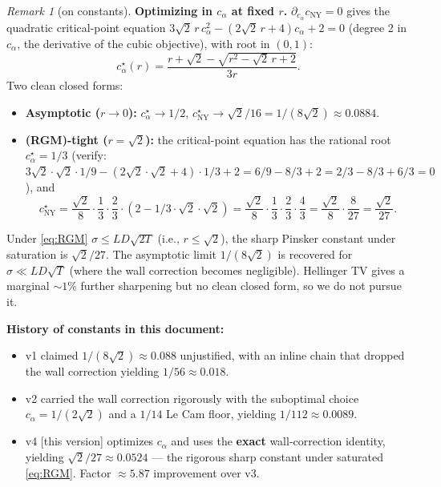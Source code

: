 \documentclass[11pt,a4paper]{article}
\theoremstyle{plain}
\theoremstyle{definition}
\theoremstyle{remark}
\newtheorem{remark}[theorem]{Remark}
\begin{document}
\begin{remark}[on constants]
\textbf{Optimizing in $c_\alpha$ at fixed $r$.} $\partial_{c_\alpha} c_\mathrm{NY} = 0$ gives the quadratic critical-point equation $3\sqrt 2\, r\, c_\alpha^2 - (2\sqrt 2\, r + 4) c_\alpha + 2 = 0$ (degree 2 in $c_\alpha$, the derivative of the cubic objective), with root in $(0, 1)$:
\[
c_\alpha^\star(r) = \frac{r + \sqrt 2 - \sqrt{r^2 - \sqrt 2\, r + 2}}{3 r}.
\]
Two clean closed forms:
\begin{itemize}
\item \textbf{Asymptotic ($r \to 0$):} $c_\alpha^\star \to 1/2$, $c_\mathrm{NY}^\star \to \sqrt 2/16 = 1/(8\sqrt 2) \approx 0.0884$.
\item \textbf{(RGM)-tight ($r = \sqrt 2$):} the critical-point equation has the rational root $c_\alpha^\star = 1/3$ (verify: $3\sqrt 2 \cdot \sqrt 2 \cdot 1/9 - (2\sqrt 2 \cdot \sqrt 2 + 4) \cdot 1/3 + 2 = 6/9 - 8/3 + 2 = 2/3 - 8/3 + 6/3 = 0$ \checkmark), and
\[
c_\mathrm{NY}^\star = \frac{\sqrt 2}{8}\cdot \frac{1}{3}\cdot \frac{2}{3}\cdot (2 - 1/3 \cdot \sqrt 2 \cdot \sqrt 2) = \frac{\sqrt 2}{8}\cdot \frac{1}{3}\cdot \frac{2}{3}\cdot \frac{4}{3} = \frac{\sqrt 2}{8}\cdot \frac{8}{27} = \frac{\sqrt 2}{27}.
\]
\end{itemize}

Under \eqref{eq:RGM} $\sigma \leq LD\sqrt{2T}$ (i.e., $r \leq \sqrt 2$), the sharp Pinsker constant under saturation is $\sqrt 2/27$. The asymptotic limit $1/(8\sqrt 2)$ is recovered for $\sigma \ll LD\sqrt T$ (where the wall correction becomes negligible). Hellinger TV gives a marginal $\sim 1\%$ further sharpening but no clean closed form, so we do not pursue it.

\textbf{History of constants in this document:}
\begin{itemize}
\item v1 claimed $1/(8\sqrt 2) \approx 0.088$ unjustified, with an inline chain that dropped the wall correction yielding $1/56 \approx 0.018$.
\item v2 carried the wall correction rigorously with the suboptimal choice $c_\alpha = 1/(2\sqrt 2)$ and a $1/14$ Le Cam floor, yielding $1/112 \approx 0.0089$.
\item v4 [this version] optimizes $c_\alpha$ and uses the \textbf{exact} wall-correction identity, yielding $\sqrt 2/27 \approx 0.0524$ --- the rigorous sharp constant under saturated \eqref{eq:RGM}. Factor $\approx 5.87$ improvement over v3.
\end{itemize}
\end{remark}
\end{document}
